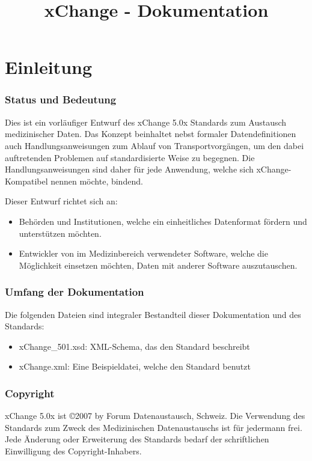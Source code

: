 \documentclass[a4paper]{scrartcl}
\begin{document}
\title{xChange - Dokumentation}
\maketitle
\part{Einleitung}
\section{Status und Bedeutung}
Dies ist ein vorläufiger Entwurf des xChange 5.0x Standards zum Austausch medizinischer Daten. Das Konzept beinhaltet nebst formaler Datendefinitionen auch Handlungsanweisungen zum Ablauf von Transportvorgängen, um den dabei auftretenden Problemen auf standardisierte Weise zu begegnen. Die Handlungsanweisungen sind daher für jede Anwendung, welche sich xChange-Kompatibel nennen möchte, bindend.

Dieser Entwurf richtet sich an:
\begin{itemize}
    \item Behörden und Institutionen, welche ein einheitliches Datenformat fördern und unterstützen möchten.
    \item Entwickler von im Medizinbereich verwendeter Software, welche die Möglichkeit einsetzen möchten, Daten mit anderer Software auszutauschen.
\end{itemize}

\section{Umfang der Dokumentation}
Die folgenden Dateien sind integraler Bestandteil dieser Dokumentation und des Standards:
\begin{itemize}
    \item xChange\_501.xsd: XML-Schema, das den Standard beschreibt
    \item xChange.xml: Eine Beispieldatei, welche den Standard benutzt
\end{itemize}

\section{Copyright}
xChange 5.0x ist \copyright 2007 by Forum Datenaustausch, Schweiz. Die Verwendung des Standards zum Zweck des Medizinischen Datenaustauschs ist für jedermann frei.
Jede Änderung oder Erweiterung des Standards bedarf der schriftlichen Einwilligung des Copyright-Inhabers.
\end{document}
